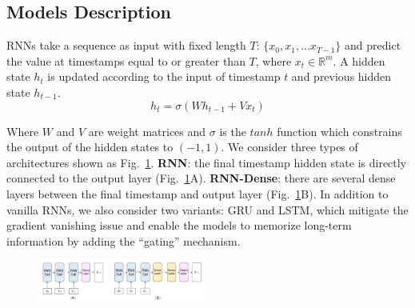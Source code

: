 \subsection{Models Description}
\label{section:model_description}
RNNs take a sequence as input with fixed length $T$: $\{x_0, x_1,... x_{T-1}\}$ and predict the value at timestamps equal to or greater than $T$, where $x_{t} \in \mathbb R^{m}$. 
A hidden state $h_t$ is updated according to the input of timestamp $t$ and previous hidden state $h_{t-1}$.
\begin{equation} 
h_t = \sigma(Wh_{t-1} + Vx_t)
\end{equation}

Where $W$ and $V$ are weight matrices and $\sigma$ is the $tanh$ function which constrains the output of the hidden states to $(-1, 1)$. We consider three types of architectures shown as Fig.~\ref{fig:model_type}. 
\textbf{RNN}: the final timestamp hidden state is directly connected to the output layer (Fig.~\ref{fig:model_type}A). \textbf{RNN-Dense}: there are several dense layers between the final timestamp and output layer (Fig.~\ref{fig:model_type}B). 
In addition to vanilla RNNs, we also consider two variants: GRU and LSTM, which mitigate the gradient vanishing issue and enable the models to memorize long-term information by adding the ``gating'' mechanism.


\begin{figure}[t]
	\centering
    \includegraphics[width=0.49\textwidth]{pictures/model_description/model.pdf}
	\vspace{-5mm}
	\caption{
	}
	\label{fig:model_type}
\end{figure}

